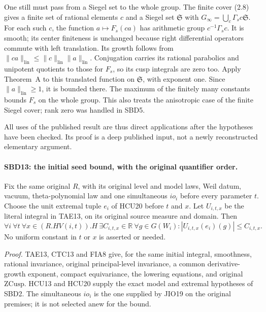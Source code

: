 One still must pass from a Siegel set to the whole group.
The finite cover (2.8) gives a finite set of rational elements
\(c\) and a Siegel set \(\mathfrak S\) with
\(G_\infty=\bigcup_c\Gamma_s c\mathfrak S\).
For each such \(c\), the function \(a\mapsto F_s(ca)\)
has arithmetic group \(c^{-1}\Gamma_s c\).  It is smooth;
its center finiteness is unchanged because right differential
operators commute with left translation.  Its growth follows
from \(\|ca\|_{\mathrm{lin}}\le
\|c\|_{\mathrm{lin}}\|a\|_{\mathrm{lin}}\).
Conjugation carries its rational parabolics and unipotent
quotients to those for \(F_s\), so its cusp integrals are
zero too.  Apply Theorem~A to this translated function on
\(\mathfrak S\), with exponent one.  Since
\(\|a\|_{\mathrm{lin}}\ge1\), it is bounded there.
The maximum of the finitely many constants bounds \(F_s\)
on the whole group.  This also treats the anisotropic case
of the finite Siegel cover; rank zero was handled in SBD5.

All uses of the published result are thus direct applications
after the hypotheses have been checked.  Its proof is a deep
published input, not a newly reconstructed elementary argument.

\paragraph{SBD13: the initial seed bound, with the original quantifier order.}
\label{claim:SBD13}
Fix the same original \(R\), with its original level and model
laws, Weil datum, vacuum, theta-polynomial law and one
simultaneous \(io_i\) before every parameter \(t\).
Choose the unit extremal tuple \(e_i\) of HCU20 before \(t\)
and \(x\).  Let \(U_{i,t,x}\) be the literal integral in
TAE13, on its original source measure and domain.  Then
\[
 \forall i\ \forall t\ \forall x\in(R.HV(i,t)).H\
 \exists C_{i,t,x}\in\mathbb R\ \forall g\in G(W_i):
       |U_{i,t,x}(e_i)(g)|\le C_{i,t,x}.
 \tag{SBD.22}
\]
No uniform constant in \(t\) or \(x\) is asserted or needed.

\emph{Proof.}
TAE13, CTC13 and FIA8 give, for the same initial integral,
smoothness, rational invariance, original principal-level
invariance, a common derivative-growth exponent, compact
equivariance, the lowering equations, and original
\(\mathrm{ZCusp}\).  HCU13 and HCU20 supply the exact model
and extremal hypotheses of SBD2.  The simultaneous \(io_i\)
is the one supplied by JIO19 on the original premises; it is
not selected anew for the bound.

